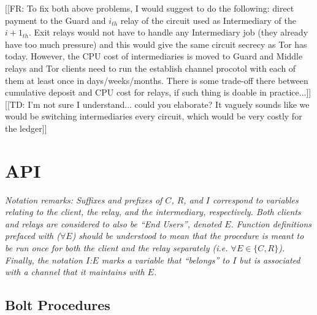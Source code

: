 \documentclass{article}
\newcommand{\flo}[1]{ {\color{blue} [[FR: #1]]}}
\newcommand{\dinh}[1]{ {\color{brown} [[TD: #1]]}}
\begin{document}
\flo{To fix both above problems, I would suggest to do the following: direct payment to the Guard and $i_{th}$ relay of the circuit used as Intermediary of the $i+1_{th}$. Exit relays would not have to handle any Intermediary job (they already have too much pressure) and this would give the same circuit secrecy as Tor has today. However, the CPU cost of intermediaries is moved to Guard and Middle relays and Tor clients need to run the establish channel procotol with each of them at least once in days/weeks/months. There is some trade-off there between cumulative deposit and CPU cost for relays, if such thing is doable in practice...}
\dinh{I'm not sure I understand... could you elaborate? It vaguely sounds like we would be switching intermediaries every circuit, which would be very costly for the ledger}

\section{API}

\textit{Notation remarks: Suffixes and prefixes of $C$, $R$, and $I$ correspond to variables relating to the client, the relay, and the intermediary, respectively. Both clients and relays are considered to also be ``End Users'', denoted $E$. Function definitions prefaced with ($\forall E$) should be understood to mean that the procedure is meant to be run once for both the client and the relay separately (i.e. $\forall E \in \{C, R\}$). Finally, the notation $I$:$E$ marks a variable that ``belongs'' to $I$ but is associated with a channel that it maintains with $E$.}

\subsection{Bolt Procedures}
\end{document}
